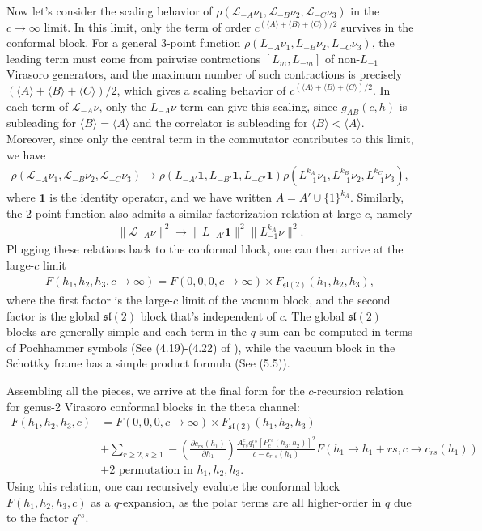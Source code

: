 \documentclass[12pt]{article}
\newcommand{\ie}{\begin{equation}\begin{aligned}}
\newcommand{\fe}{\end{aligned}\end{equation}}
\numberwithin{equation}{section}
\begin{document}
Now let's consider the scaling behavior of $\rho(\mathcal{L}_{-A}\nu_1, \mathcal{L}_{-B}\nu_2, \mathcal{L}_{-C}\nu_3)$ in the $c\rightarrow \infty$ limit. In this limit, only the term of order $c^{(\langle A\rangle+\langle B\rangle+\langle C\rangle)/2}$ survives in the conformal block. For a general 3-point function $\rho(L_{-A}\nu_1, L_{-B}\nu_2, L_{-C}\nu_3)$, the leading term must come from pairwise contractions $[L_m, L_{-m}]$ of non-$L_{-1}$ Virasoro generators, and the maximum number of such contractions is precisely $(\langle A\rangle+\langle B\rangle+\langle C\rangle)/2$, which gives a scaling behavior of $c^{(\langle A\rangle+\langle B\rangle+\langle C\rangle)/2}$. In each term of $\mathcal{L}_{-A}\nu$, only the $L_{-A}\nu$ term can give this scaling, since $g_{AB}(c,h)$ is subleading for $\langle B\rangle = \langle A\rangle$ and the correlator is subleading for $\langle B\rangle<\langle A\rangle $. Moreover, since only the central term in the commutator contributes to this limit, we have
\ie\label{eq:gram-smith}
\rho(\mathcal{L}_{-A}\nu_1, \mathcal{L}_{-B}\nu_2, \mathcal{L}_{-C}\nu_3)\rightarrow \rho(L_{-A'}\mathbf{1}, L_{-B'}\mathbf{1}, L_{-C'}\mathbf{1})\rho(L_{-1}^{k_A}\nu_1, L_{-1}^{k_B}\nu_2, L_{-1}^{k_C}\nu_3),
\fe
where $\mathbf{1}$ is the identity operator, and we have written $A= A'\cup \{1\}^{k_A}$. Similarly, the 2-point function also admits a similar factorization relation at large $c$, namely
\ie
\|\mathcal{L}_{-A}\nu\|^2 \rightarrow \|L_{-A'}\mathbf{1}\|^2 \|L_{-1}^{k_A}\nu\|^2.
\fe
Plugging these relations back to the conformal block, one can then arrive at the large-$c$ limit
\ie
F(h_1, h_2, h_3,c\rightarrow \infty) = F(0, 0, 0,c\rightarrow \infty)\times F_{\mathfrak{sl}(2)}(h_1, h_2, h_3),
\fe
where the first factor is the large-$c$ limit of the vacuum block, and the second factor is the global $\mathfrak{sl}(2)$ block that's independent of $c$.  The global $\mathfrak{sl}(2)$ blocks are generally simple and each term in the $q$-sum can be computed in terms of Pochhammer symbols (See (4.19)-(4.22) of \cite{Cho-Collier-Yin}), while the vacuum block in the Schottky frame has a simple product formula (See (5.5)).

Assembling all the pieces, we arrive at the final form for the $c$-recursion relation for genus-2 Virasoro conformal blocks in the theta channel:
\ie
F(h_1, h_2, h_3, c) &= F(0, 0, 0,c\rightarrow \infty)\times F_{\mathfrak{sl}(2)}(h_1, h_2, h_3)\\
&+ \sum_{r\geq 2,s\geq 1} -\left(\frac{\partial c_{rs}(h_1)}{\partial h_1}\right) \frac{A^c_{rs} q_1^{rs} [P_c^{rs}(h_3, h_2)]^2}{c-c_{r,s}(h_1)} F(h_1\rightarrow h_1+rs,c\rightarrow c_{rs}(h_1)) \\
&+ 2\text{ permutation in }h_1, h_2, h_3.
\fe
Using this relation, one can recursively evalute the conformal block $F(h_1, h_2, h_3, c)$ as a $q$-expansion, as the polar terms are all higher-order in $q$ due to the factor $q^{rs}$.
\end{document}
